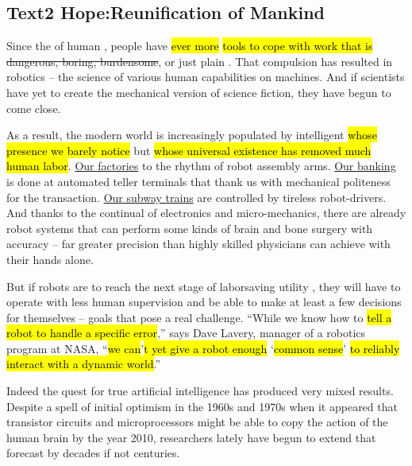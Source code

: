 \subsection{Text2 Hope:Reunification of Mankind}
Since the 
of human 
, people have 
\hl{ever more }
\hl{tools to cope with work that is }
\st{dangerous, boring, burdensome}, or just plain
. That compulsion has resulted in robotics -- the science of 
various human capabilities on machines. And if scientists have yet to create the mechanical version of science fiction, they have begun to come close.

As a result, the modern world is increasingly populated by intelligent 
\hl{ whose presence we barely notice} but \hl{whose universal existence has removed much human labor}. \underline{Our factories} 
  to the rhythm of robot assembly arms. \underline{Our banking} is done at 
  automated teller terminals
   that thank us with mechanical politeness for the transaction. 
   \underline{Our subway trains} are controlled by tireless robot-drivers. And thanks to the continual 
  of electronics and micro-mechanics, there are already robot systems that can perform some kinds of brain and bone surgery with 
  accuracy -- far greater precision than highly skilled physicians can achieve with their hands alone.

But if robots are to reach the next stage of laborsaving 
utility
, they will have to operate with less human 
supervision
 and be able to make at least a few decisions for themselves -- goals that pose a real challenge. “While we know how to  \hl{tell a robot to handle a specific error},” says Dave Lavery, manager of a robotics program at NASA, 
   “\hl{we can}’\hl{t yet give a robot enough }‘\hl{common sense}’ \hl{to reliably interact with a dynamic world}.”

Indeed the 
quest
 for true artificial intelligence has produced very mixed results. Despite a 
 spell 
 of initial optimism in the 1960s and 1970s when it appeared that 
 transistor 
 circuits and microprocessors might be able to copy the action of the human brain by the year 2010, researchers lately have begun to extend that forecast by decades if not centuries.

